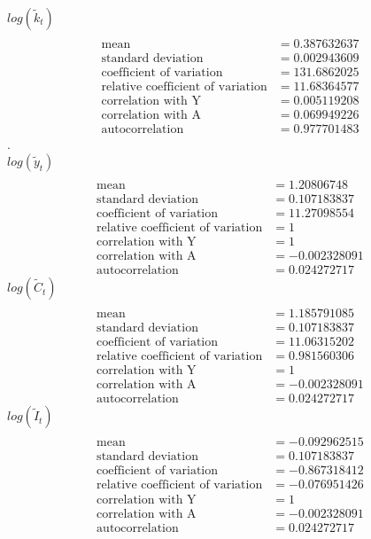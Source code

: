 \documentclass[letterpaper,12pt]{article}
\theoremstyle{definition}
\begin{document}
$log(\tilde{k}_t)$
\begin{align*}
\\\text{mean} &= 0.387632637
\\\text{standard deviation} &= 0.002943609
\\\text{coefficient of variation}&=131.6862025
\\\text{relative coefficient of variation}&=11.68364577
\\\text{correlation with Y}&=0.005119208
\\\text{correlation with A}&=0.069949226
\\\text{autocorrelation}&=0.977701483
\end{align*}
.\\
$log(\tilde{y}_t)$
\begin{align*}
\\\text{mean} &= 1.20806748
\\\text{standard deviation} &= 0.107183837
\\\text{coefficient of variation}&=11.27098554
\\\text{relative coefficient of variation}&=1
\\\text{correlation with Y}&=1
\\\text{correlation with A}&=-0.002328091
\\\text{autocorrelation}&=0.024272717
\end{align*}
$log(\tilde{C}_t)$
\begin{align*}
\\\text{mean} &= 1.185791085
\\\text{standard deviation} &= 0.107183837
\\\text{coefficient of variation}&=11.06315202
\\\text{relative coefficient of variation}&=0.981560306
\\\text{correlation with Y}&=1
\\\text{correlation with A}&=-0.002328091
\\\text{autocorrelation}&=0.024272717
\end{align*}
$log(\tilde{I}_t)$
\begin{align*}
\\\text{mean} &= -0.092962515
\\\text{standard deviation} &= 0.107183837
\\\text{coefficient of variation}&=-0.867318412
\\\text{relative coefficient of variation}&=-0.076951426
\\\text{correlation with Y}&=1
\\\text{correlation with A}&=-0.002328091
\\\text{autocorrelation}&=0.024272717
\end{align*}
\end{document}
